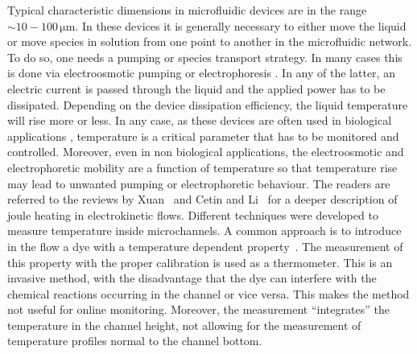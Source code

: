 \documentclass[twocolumn]{svjour3}       %
\begin{document}
Typical characteristic dimensions in microfluidic devices are in the range $\sim10-100\, \mathrm{\mu m}$. In these devices it is generally necessary to either move the liquid or move species in solution from one point to another in the microfluidic network. To do so, one needs a pumping or species transport strategy. In many cases this is done via electroosmotic pumping or electrophoresis \cite{hunter2001,lyklema1995}. In any of the latter, an electric current is passed through the liquid and the applied power has to be dissipated. Depending on the device dissipation efficiency, the liquid temperature will rise more or less. In any case, as these devices are often used in biological applications \cite{tian2008}, temperature is a critical parameter that has to be monitored and controlled. Moreover, even in non biological applications, the electroosmotic and electrophoretic mobility are a function of temperature \cite{tang2006} so that temperature rise may lead to unwanted pumping or electrophoretic behaviour. The readers are referred to the reviews by Xuan~\cite{xuan2008} and Cetin and Li~\cite{cetin2008} for a deeper description of joule heating in electrokinetic flows. 
Different techniques were developed to measure temperature inside microchannels. A common approach is to introduce in the flow a dye with a temperature dependent property~\cite{tang2006,ross2001,erickson2003,dye1,dye2}. The measurement of this property with the proper calibration is used as a thermometer. This is an invasive method, with the disadvantage that the dye can interfere with the chemical reactions occurring in the channel or vice versa. This makes the method not useful for online monitoring. Moreover, the measurement ``integrates'' the temperature in the channel height, not allowing for the measurement of temperature profiles normal to the channel bottom. 
\end{document}
